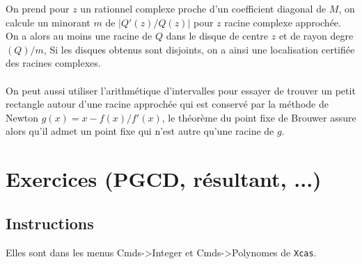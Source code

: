 \documentclass[a4paper,11pt]{book}
\begin{document}
\begin{giacjshere}
\begin{itemize}
On prend pour $z$ un rationnel complexe proche d'un coefficient
diagonal de $M$, on calcule un minorant $m$ de $|Q'(z)/Q(z)|$ 
pour $z$ racine complexe approch\'ee. On a alors au moins
une racine de $Q$ dans le disque de centre $z$ 
et de rayon degre$(Q)/m$, Si les disques obtenus sont
disjoints, on a ainsi une localisation certifi\'ee des racines
complexes.\\
\\
On peut aussi utiliser l'arithmétique d'intervalles pour
essayer de trouver un petit rectangle autour d'une racine approchée
qui est conservé par la méthode de Newton $g(x)=x-f(x)/f'(x)$,
le théorème du point fixe de Brouwer assure alors qu'il admet
un point fixe qui n'est autre qu'une racine de $g$.
\end{itemize}

\pagebreak

\chapter{Exercices (PGCD, r\'esultant, ...)}

\section{Instructions}
Elles sont dans les menus
Cmds->Integer et Cmds->Polynomes de \verb|Xcas|.


\end{giacjshere}
\end{document}
